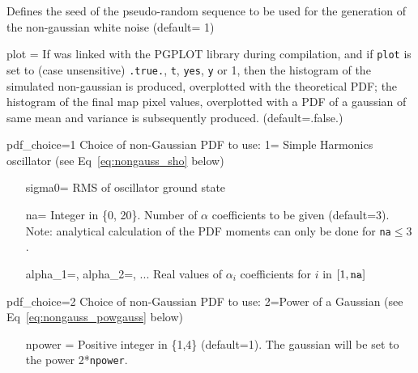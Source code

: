 \begin{qualifiers}
\begin{qulistwide}{}
 Defines the seed of the pseudo-random sequence to be used 
for the generation of the non-gaussian white noise (default= 1)
%
     \item[{plot = }]%
 If \thedocid was linked with the PGPLOT library during compilation, and
if {\tt plot} is set to (case unsensitive) {\tt .true.}, {\tt t}, {\tt yes}, {\tt y}  or
1, then the histogram of the simulated non-gaussian is produced, overplotted
with the theoretical PDF; the histogram of the final map pixel values,
overplotted with a PDF of a gaussian of same mean and variance is subsequently
produced.
(default=.false.)
%
     \item[{pdf\_choice=1 }]%
 Choice of non-Gaussian PDF to use: 1= Simple
Harmonics oscillator (see Eq~\ref{eq:nongauss_sho} below)
%
    \begin{itemize}
      \item[{sigma0= }]%
 RMS of oscillator ground state
%
      \item[{na= }]%
 Integer in \{0, 20\}. Number of $\alpha$ coefficients to be
given (default=3).
Note: analytical calculation of the PDF moments
can only be done for {\tt na}$\le 3$. 
%
      \item[{alpha\_1=, alpha\_2=, ... }]%
%
%
 Real values of $\alpha_i$ coefficients for
$i$ in $[1, {\tt na}]$
     \end{itemize}
%
     \item[{pdf\_choice=2}] Choice of non-Gaussian PDF to use: 2=Power of a
Gaussian (see Eq~\ref{eq:nongauss_powgauss} below)
      \begin{itemize}
     \item[{npower = }]%
 Positive integer in \{1,4\} (default=1). The gaussian
will be set to the power 2*{\tt npower}.
     \end{itemize}
%
  \end{qulistwide}
\end{qualifiers}
\newpage

